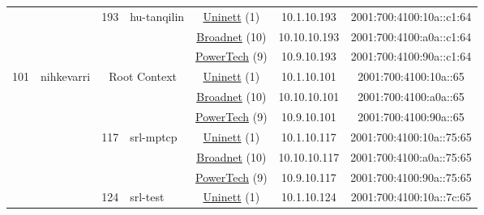 \begin{small}
\begin{center}
\begin{longtable}{|c|c|c|c|c|c|c|c|}
  &  & \multirow{3}{*}{\tiny{193}} & \multicolumn{1}{|l|}{\multirow{3}{*}{\tiny{hu-tanqilin}}} & \multicolumn{2}{|c|}{\tiny{\href{https://www.uninett.no}{Uninett} (1)}} & \tiny{10.1.10.193} & \tiny{2001:700:4100:10a::c1:64} \\* \cline{5-5}\cline{6-6}\cline{7-7}\cline{8-8}
  &  &  &  & \multicolumn{2}{|c|}{\tiny{\href{https://www.broadnet.no}{Broadnet} (10)}} & \tiny{10.10.10.193} & \tiny{2001:700:4100:a0a::c1:64} \\* \cline{5-5}\cline{6-6}\cline{7-7}\cline{8-8}
  &  &  &  & \multicolumn{2}{|c|}{\tiny{\href{http://www.powertech.no}{PowerTech} (9)}} & \tiny{10.9.10.193} & \tiny{2001:700:4100:90a::c1:64} \\ \hline
 \multirow{30}{*}{\tiny{101}} & \multicolumn{1}{|l|}{\multirow{30}{*}{\tiny{nihkevarri}}} & \multicolumn{2}{|c|}{\multirow{3}{*}{\tiny{Root Context}}} & \multicolumn{2}{|c|}{\tiny{\href{https://www.uninett.no}{Uninett} (1)}} & \tiny{10.1.10.101} & \tiny{2001:700:4100:10a::65} \\* \cline{5-5}\cline{6-6}\cline{7-7}\cline{8-8}
  &  & \multicolumn{2}{|c|}{} & \multicolumn{2}{|c|}{\tiny{\href{https://www.broadnet.no}{Broadnet} (10)}} & \tiny{10.10.10.101} & \tiny{2001:700:4100:a0a::65} \\* \cline{5-5}\cline{6-6}\cline{7-7}\cline{8-8}
  &  & \multicolumn{2}{|c|}{} & \multicolumn{2}{|c|}{\tiny{\href{http://www.powertech.no}{PowerTech} (9)}} & \tiny{10.9.10.101} & \tiny{2001:700:4100:90a::65} \\* \cline{3-3}\cline{4-4}\cline{5-5}\cline{6-6}\cline{7-7}\cline{8-8}
  &  & \multirow{3}{*}{\tiny{117}} & \multicolumn{1}{|l|}{\multirow{3}{*}{\tiny{srl-mptcp}}} & \multicolumn{2}{|c|}{\tiny{\href{https://www.uninett.no}{Uninett} (1)}} & \tiny{10.1.10.117} & \tiny{2001:700:4100:10a::75:65} \\* \cline{5-5}\cline{6-6}\cline{7-7}\cline{8-8}
  &  &  &  & \multicolumn{2}{|c|}{\tiny{\href{https://www.broadnet.no}{Broadnet} (10)}} & \tiny{10.10.10.117} & \tiny{2001:700:4100:a0a::75:65} \\* \cline{5-5}\cline{6-6}\cline{7-7}\cline{8-8}
  &  &  &  & \multicolumn{2}{|c|}{\tiny{\href{http://www.powertech.no}{PowerTech} (9)}} & \tiny{10.9.10.117} & \tiny{2001:700:4100:90a::75:65} \\* \cline{3-3}\cline{4-4}\cline{5-5}\cline{6-6}\cline{7-7}\cline{8-8}
  &  & \multirow{3}{*}{\tiny{124}} & \multicolumn{1}{|l|}{\multirow{3}{*}{\tiny{srl-test}}} & \multicolumn{2}{|c|}{\tiny{\href{https://www.uninett.no}{Uninett} (1)}} & \tiny{10.1.10.124} & \tiny{2001:700:4100:10a::7c:65} \\* \cline{5-5}\cline{6-6}\cline{7-7}\cline{8-8}

\end{longtable}
\end{center}
\end{small}
